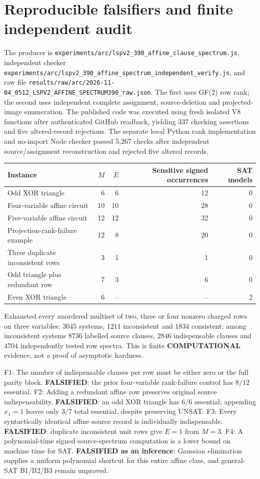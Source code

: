 \documentclass[11pt]{article}
\begin{document}
\section*{Reproducible falsifiers and finite independent audit}
The producer is \texttt{experiments/arc/lspv2\_390\_affine\_clause\_spectrum.js}, independent checker \texttt{experiments/arc/lspv2\_390\_affine\_spectrum\_independent\_verify.js}, and raw file \texttt{results/raw/arc/2026-11-04\_0512\_LSPV2\_AFFINE\_SPECTRUM390\_raw.json}. The first uses GF(2) row rank; the second uses independent complete assignment, source-deletion and projected-image enumeration. The published code was executed using fresh isolated V8 functions after authenticated GitHub readback, yielding 337 checking assertions and five altered-record rejections. The separate local Python rank implementation and no-import Node checker passed 5,267 checks after independent source/assignment reconstruction and rejected five altered records.

\begin{center}\begin{tabular}{lrrrr}
\toprule Instance & $M$ & $E$ & Sensitive signed occurrences & SAT models\\\midrule
Odd XOR triangle &6&6&12&0\\
Four-variable affine circuit &10&10&28&0\\
Five-variable affine circuit &12&12&32&0\\
Projection-rank-failure example &12&8&20&0\\
Three duplicate inconsistent rows &3&1&1&0\\
Odd triangle plus redundant row &7&3&6&0\\
Even XOR triangle &6&--&--&2\\\bottomrule
\end{tabular}\end{center}
Exhausted every unordered multiset of two, three or four nonzero charged rows on three variables: $3045$ systems, $1211$ inconsistent and $1834$ consistent; among inconsistent systems $8736$ labelled source clauses, $2846$ indispensable clauses and $4704$ independently tested row spectra. This is finite \textbf{COMPUTATIONAL} evidence, not a proof of asymptotic hardness.

\noindent F1: The number of indispensable clauses per row must be either zero or the full parity block. \textbf{FALSIFIED}: the prior four-variable rank-failure control has $8/12$ essential. F2: Adding a redundant affine row preserves original source indispensability. \textbf{FALSIFIED}: an odd XOR triangle has $6/6$ essential; appending $x_1=1$ leaves only $3/7$ total essential, despite preserving UNSAT. F3: Every syntactically identical affine source record is individually indispensable. \textbf{FALSIFIED}: duplicate inconsistent unit rows give $E=1$ from $M=3$. F4: A polynomial-time signed source-spectrum computation is a lower bound on machine time for SAT. \textbf{FALSIFIED as an inference}: Gaussian elimination supplies a uniform polynomial shortcut for this entire affine class, and general-SAT B1/B2/B3 remain unproved.
\end{document}
